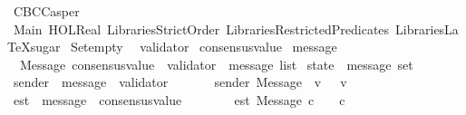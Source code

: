 %
\begin{isabellebody}%
%
%
\isadelimdocument
%
\endisadelimdocument
%
\isatagdocument
%
\isamarkuptrue%
%
\endisatagdocument
{\isafolddocument}%
%
\isadelimdocument
%
\endisadelimdocument
%
\isadelimtheory
%
\endisadelimtheory
%
\isatagtheory
{}\isamarkupfalse%
\ CBCCasper\isanewline
\isanewline
{}\ Main\ HOL{\isachardot}Real\ {\isachardoublequoteopen}Libraries{\isacharslash}Strict{\isacharunderscore}Order{\isachardoublequoteclose}\ {\isachardoublequoteopen}Libraries{\isacharslash}Restricted{\isacharunderscore}Predicates{\isachardoublequoteclose}\ {\isachardoublequoteopen}Libraries{\isacharslash}LaTeXsugar{\isachardoublequoteclose}\isanewline
\isanewline
{}%
\endisatagtheory
{\isafoldtheory}%
%
\isadelimtheory
\isanewline
%
\endisadelimtheory
\isanewline
\isanewline
\isanewline
\isanewline
\isanewline
\isanewline
\isanewline
{}\isamarkupfalse%
\ Set{\isachardot}empty\ {\isacharparenleft}{\isachardoublequoteopen}{\isasymemptyset}{\isachardoublequoteclose}{\isacharparenright}\isanewline
\isanewline
\isanewline
{}\isamarkupfalse%
\ validator\isanewline
\isanewline
{}\isamarkupfalse%
\ consensus{\isacharunderscore}value\isanewline
\isanewline
\isanewline
{}\isamarkupfalse%
\ message\ {\isacharequal}\isanewline
\ \ Message\ {\isachardoublequoteopen}consensus{\isacharunderscore}value\ {\isacharasterisk}\ validator\ {\isacharasterisk}\ message\ list{\isachardoublequoteclose}\isanewline
\isanewline
{}\isamarkupfalse%
\ state\ {\isacharequal}\ {\isachardoublequoteopen}message\ set{\isachardoublequoteclose}\isanewline
\isanewline
\isanewline
\isanewline
{}\isamarkupfalse%
\ sender\ {\isacharcolon}{\isacharcolon}\ {\isachardoublequoteopen}message\ {\isasymRightarrow}\ validator{\isachardoublequoteclose}\isanewline
\ \ \isanewline
\ \ \ \ {\isachardoublequoteopen}sender\ {\isacharparenleft}Message\ {\isacharparenleft}{\isacharunderscore}{\isacharcomma}\ v{\isacharcomma}\ {\isacharunderscore}{\isacharparenright}{\isacharparenright}\ {\isacharequal}\ v{\isachardoublequoteclose}\isanewline
\isanewline
{}\isamarkupfalse%
\ est\ {\isacharcolon}{\isacharcolon}\ {\isachardoublequoteopen}message\ {\isasymRightarrow}\ consensus{\isacharunderscore}value{\isachardoublequoteclose}\isanewline
\ \ \isanewline
\ \ \ \ \ {\isachardoublequoteopen}est\ {\isacharparenleft}Message\ {\isacharparenleft}c{\isacharcomma}\ {\isacharunderscore}{\isacharcomma}\ {\isacharunderscore}{\isacharparenright}{\isacharparenright}\ {\isacharequal}\ c{\isachardoublequoteclose}\isanewline

\end{isabellebody}
